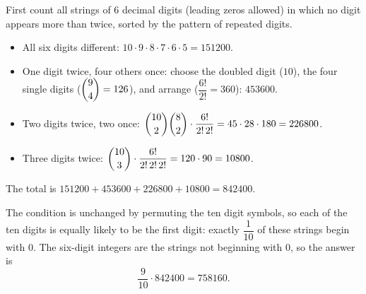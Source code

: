 First count all strings of $6$ decimal digits (leading zeros allowed) in which no digit appears more than twice, sorted by the pattern of repeated digits.
\begin{itemize}
\item All six digits different: $10\cdot9\cdot8\cdot7\cdot6\cdot5=151200$.
\item One digit twice, four others once: choose the doubled digit ($10$), the four single digits ($\dbinom94=126$), and arrange ($\dfrac{6!}{2!}=360$): $453600$.
\item Two digits twice, two once: $\dbinom{10}{2}\dbinom82\cdot\dfrac{6!}{2!\,2!}=45\cdot28\cdot180=226800$.
\item Three digits twice: $\dbinom{10}{3}\cdot\dfrac{6!}{2!\,2!\,2!}=120\cdot90=10800$.
\end{itemize}
The total is $151200+453600+226800+10800=842400$.

The condition is unchanged by permuting the ten digit symbols, so each of the ten digits is equally likely to be the first digit: exactly $\dfrac{1}{10}$ of these strings begin with $0$. The six-digit integers are the strings not beginning with $0$, so the answer is
\[
\dfrac{9}{10}\cdot 842400=\boxed{758160}.
\]

